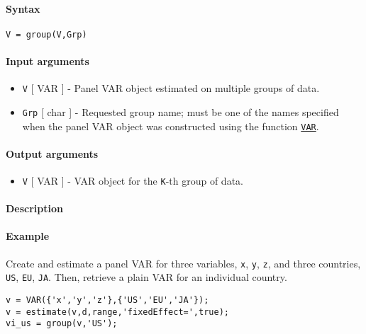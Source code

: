 


	\paragraph{Syntax}

\begin{verbatim}
V = group(V,Grp)
\end{verbatim}

\paragraph{Input arguments}

\begin{itemize}
\item
  \texttt{V} {[} VAR {]} - Panel VAR object estimated on multiple groups
  of data.
\item
  \texttt{Grp} {[} char {]} - Requested group name; must be one of the
  names specified when the panel VAR object was constructed using the
  function \href{VAR/VAR}{\texttt{VAR}}.
\end{itemize}

\paragraph{Output arguments}

\begin{itemize}
\itemsep1pt\parskip0pt
\item
  \texttt{V} {[} VAR {]} - VAR object for the \texttt{K}-th group of
  data.
\end{itemize}

\paragraph{Description}

\paragraph{Example}

Create and estimate a panel VAR for three variables, \texttt{x},
\texttt{y}, \texttt{z}, and three countries, \texttt{US}, \texttt{EU},
\texttt{JA}. Then, retrieve a plain VAR for an individual country.

\begin{verbatim}
v = VAR({'x','y','z'},{'US','EU','JA'});
v = estimate(v,d,range,'fixedEffect=',true);
vi_us = group(v,'US');
\end{verbatim}


